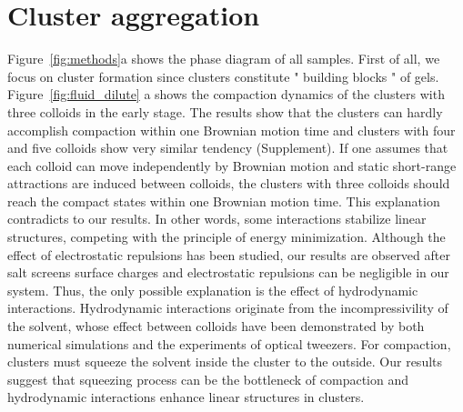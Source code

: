 \section{Cluster aggregation} %
Figure~\ref{fig:methods}a shows the phase diagram of all samples.
First of all, we focus on cluster formation since clusters constitute " building blocks " of gels.
Figure~\ref{fig:fluid_dilute} a shows the compaction dynamics of the clusters with three colloids in the early stage.
The results show that the clusters can hardly accomplish compaction within one Brownian motion time and clusters with four and five colloids show very similar tendency (Supplement).
If one assumes that each colloid can move independently by Brownian motion and static short-range attractions are induced between colloids, the clusters with three colloids should reach the compact states within one Brownian motion time.
This explanation contradicts to our results.
In other words, some interactions stabilize linear structures, competing with the principle of energy minimization.
Although the effect of electrostatic repulsions has been studied, our results are observed after salt screens surface charges and electrostatic repulsions can be negligible in our system.
Thus, the only possible explanation is the effect of hydrodynamic interactions.
Hydrodynamic interactions originate from the incompressivility of the solvent, whose effect between colloids have been demonstrated by both numerical simulations and the experiments of optical tweezers.
For compaction, clusters must squeeze the solvent inside the cluster to the outside.
Our results suggest that squeezing process can be the bottleneck of compaction and hydrodynamic interactions enhance linear structures in clusters.



